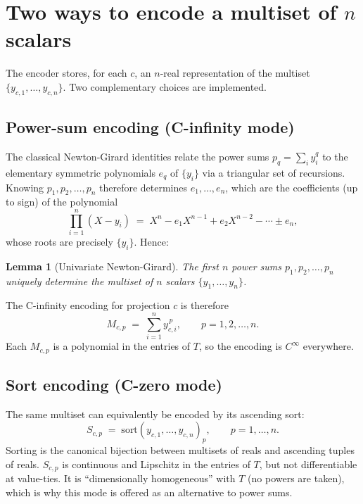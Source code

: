 \documentclass[a4paper,11pt]{article}
\newtheorem{lemma}{Lemma}
\begin{document}
\section{Two ways to encode a multiset of $n$ scalars}

The encoder stores, for each $c$, an $n$-real representation of the
multiset $\{y_{c, 1}, \ldots, y_{c, n}\}$.  Two complementary choices
are implemented.

\subsection{Power-sum encoding (C-infinity mode)}

The classical Newton-Girard identities relate the power sums
$p_q = \sum_i y_i^q$ to the elementary symmetric polynomials $e_q$ of
$\{y_i\}$ via a triangular set of recursions.  Knowing $p_1, p_2, \ldots,
p_n$ therefore determines $e_1, \ldots, e_n$, which are the
coefficients (up to sign) of the polynomial
\[
  \prod_{i=1}^{n} (X - y_i)
  \;=\; X^n - e_1 X^{n-1} + e_2 X^{n-2} - \cdots \pm e_n,
\]
whose roots are precisely $\{y_i\}$.  Hence:

\begin{lemma}[Univariate Newton-Girard]
The first $n$ power sums $p_1, p_2, \ldots, p_n$ uniquely determine the
multiset of $n$ scalars $\{y_1, \ldots, y_n\}$.
\end{lemma}

The C-infinity encoding for projection $c$ is therefore
\[
  M_{c, p} \;=\; \sum_{i=1}^{n} y_{c, i}^{\,p}, \qquad p = 1, 2, \ldots, n.
\]
Each $M_{c, p}$ is a polynomial in the entries of $T$, so the encoding
is $C^\infty$ everywhere.

\subsection{Sort encoding (C-zero mode)}

The same multiset can equivalently be encoded by its ascending sort:
\[
  S_{c, p} \;=\; \text{sort}(y_{c, 1}, \ldots, y_{c, n})_p,
  \qquad p = 1, \ldots, n.
\]
Sorting is the canonical bijection between multisets of reals and
ascending tuples of reals.  $S_{c, p}$ is continuous and Lipschitz in
the entries of $T$, but not differentiable at value-ties.  It is
``dimensionally homogeneous'' with $T$ (no powers are taken), which is
why this mode is offered as an alternative to power sums.
\end{document}
